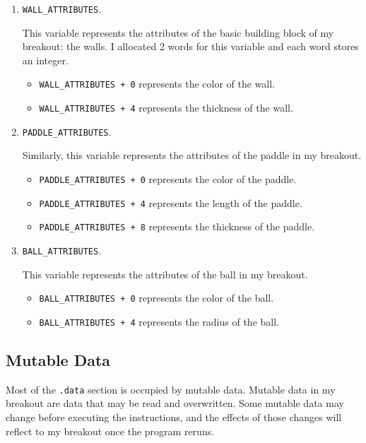 \documentclass{article}
\newcommand{\code}[1]{\texttt{#1}}
\begin{document}
\begin{enumerate}
\item \code{WALL\_ATTRIBUTES}.

This variable represents the attributes of the basic building block of my breakout: the walls. I allocated 2 words for this variable and each word stores an integer. 

\begin{itemize}
    \item \code{WALL\_ATTRIBUTES + 0} represents the color of the wall.
    \item \code{WALL\_ATTRIBUTES + 4} represents the thickness of the wall.
\end{itemize}

\item \code{PADDLE\_ATTRIBUTES}.

Similarly, this variable represents the attributes of the paddle in my breakout.

\begin{itemize}
    \item \code{PADDLE\_ATTRIBUTES + 0} represents the color of the paddle.
    \item \code{PADDLE\_ATTRIBUTES + 4} represents the length of the paddle.
    \item \code{PADDLE\_ATTRIBUTES + 8} represents the thickness of the paddle.
\end{itemize}

\item \code{BALL\_ATTRIBUTES}.

This variable represents the attributes of the ball in my breakout.

\begin{itemize}
    \item \code{BALL\_ATTRIBUTES + 0} represents the color of the ball.
    \item \code{BALL\_ATTRIBUTES + 4} represents the radius of the ball.
\end{itemize}

\end{enumerate}

\subsection{Mutable Data}

Most of the \code{.data} section is occupied by mutable data. Mutable data in my breakout are data that may be read and overwritten. Some mutable data may change before executing the instructions, and the effects of those changes will reflect to my breakout once the program reruns.
\end{document}
